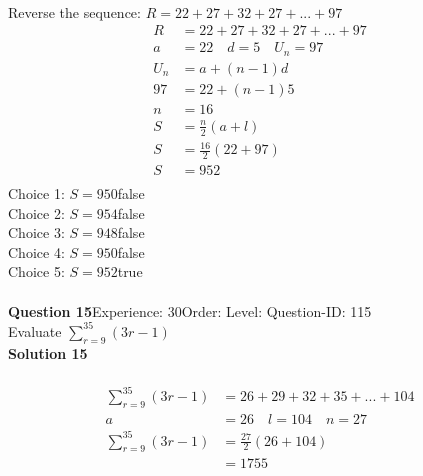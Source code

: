 \documentclass{article}
\begin{document}
\\[-35pt]Reverse the sequence: $R=22+27+32+27+...+97$
\begin{align*}
R&=22+27+32+27+...+97\\[2pt]
a&=22\quad d=5 \quad U_n=97\\[2pt]
U_n&=a+(n-1)d\\[2pt]
97&=22+(n-1)5\\[2pt]
n&=16\\[12pt]
S&=\displaystyle\frac{n}{2}(a+l)\\[2pt]
S&=\displaystyle\frac{16}{2}(22+97)\\[2pt]
S&=952\\
\end{align*}
Choice 1: \hspace{20pt}$S=950$\hspace{20pt}false\\
Choice 2: \hspace{20pt}$S=954$\hspace{20pt}false\\
Choice 3: \hspace{20pt}$S=948$\hspace{20pt}false\\
Choice 4: \hspace{20pt}$S=950$\hspace{20pt}false\\
Choice 5: \hspace{20pt}$S=952$\hspace{20pt}true\\
\\[4pt]
\noindent\textbf{Question 15}\hspace{20pt}Experience: 30\hspace{20pt}Order: \hspace{20pt}Level: \hspace{20pt}Question-ID: 115\\[2pt]
Evaluate $\displaystyle\sum_{r=9}^{35} (3r-1)$\\[4pt]
\noindent\textbf{Solution 15}\\[2pt]
\\[-35pt]\begin{align*}
\displaystyle\sum_{r=9}^{35} (3r-1)&=26+29+32+35+...+104\\[2pt]
a&=26\quad l=104 \quad n=27\\[2pt]
\displaystyle\sum_{r=9}^{35} (3r-1)&=\displaystyle\frac{27}{2}(26+104)\\[2pt]
&=1755
\end{align*}
\end{document}
